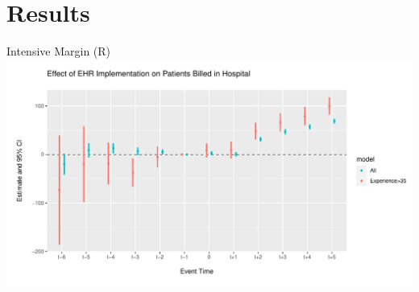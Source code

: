 \documentclass[10pt]{beamer}
\begin{document}
\section{Results}

\begin{frame}{Intensive Margin (R)}
\centering
\includegraphics[scale=.45]{Objects/event_plot.pdf}
\end{frame}
\end{document}

